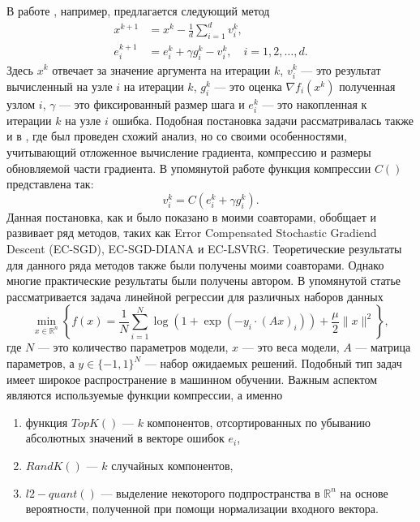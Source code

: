   В работе \cite{GorbunovKMR20}, например, предлагается следующий метод
  $$
  \begin{aligned} 
    x^{k+1} &=x^k-\frac{1}{d} \sum_{i=1}^d v_i^k, \\ 
    e_i^{k+1} &=e_i^k + \gamma g_i^k - v_i^k, \quad i=1,2, \ldots, d . 
  \end{aligned}
  $$
  Здесь $x^k$ отвечает за значение аргумента на итерации $k$, $v_i^k$ --- это результат вычисленный на узле $i$ на итерации $k$, $g_i^k$ --- это оценка $\nabla f_i(x^k)$ полученная узлом $i$, $\gamma$ --- это фиксированный размер шага и $e_i^k$ --- это накопленная к итерации $k$ на узле $i$ ошибка.  Подобная постановка задачи рассматривалась также и в \cite{err_fdbk}, где был проведен схожий анализ, но со своими особенностями, учитывающий отложенное вычисление градиента, компрессию и размеры обновляемой части градиента.
  В упомянутой работе функция компрессии $C()$ представлена так:
  $$
    v_i^k = C(e_i^k + \gamma g_i^k).
  $$
  Данная постановка, как и было показано в \cite{GorbunovKMR20} моими соавторами, обобщает и развивает ряд методов, таких как Error Compensated Stochastic Gradiend Descent (EC-SGD), EC-SGD-DIANA и EC-LSVRG. Теоретические результаты для данного ряда методов также были получены моими соавторами. Однако многие практические результаты были получены автором. В упомянутой статье рассматривается задача линейной регрессии для различных наборов данных
  $$
    \min_{x \in \mathbb{R}^n}\left\{ f(x) = \frac{1}{N} \sum_{i=1}^N \log \left(1+\exp \left(- y_i \cdot(A x)_i\right)\right) + \frac{\mu}{2}\|x\|^2 \right\},
  $$
  где $N$ --- это количество параметров модели, $x$ --- это веса модели, $A$ --- матрица параметров, а $y \in {\{-1,1\}}^N$ --- набор ожидаемых решений. Подобный тип задач имеет широкое распространение в машинном обучении. Важным аспектом являются используемые функции компрессии, а именно 
  \begin{enumerate}
    \item функция $TopK()$ --- $k$ компонентов, отсортированных по убыванию абсолютных значений в векторе ошибок $e_i$,
    \item $RandK()$ --- $k$ случайных компонентов,
    \item $l2-quant()$ --- выделение некоторого подпространства в $\mathbb{R}^n$ на основе вероятности, полученной при помощи нормализации входного вектора. 
  \end{enumerate}

